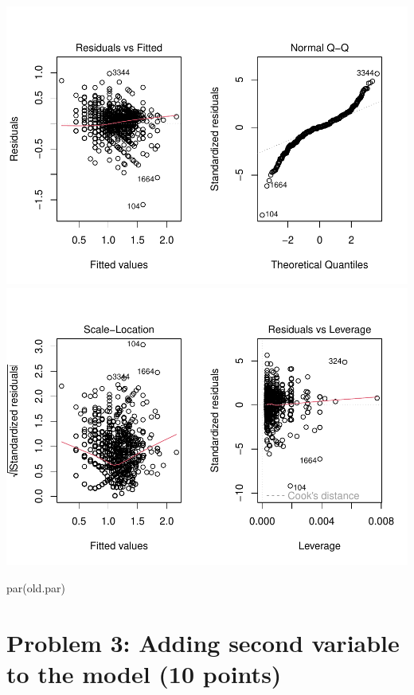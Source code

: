 \documentclass[
]{article}
\newenvironment{Shaded}{\begin{snugshade}}{\end{snugshade}}
\newcommand{\FunctionTok}[1]{\textcolor[rgb]{0.00,0.00,0.00}{#1}}
\newcommand{\NormalTok}[1]{#1}
\begin{document}
\includegraphics{linear_regression__uc_files/figure-latex/Problem2_Q3-1.pdf}
\includegraphics{linear_regression__uc_files/figure-latex/Problem2_Q3-2.pdf}

\begin{Shaded}
\begin{Highlighting}[]
\FunctionTok{par}\NormalTok{(old.par)}
\end{Highlighting}
\end{Shaded}

\hypertarget{problem-3-adding-second-variable-to-the-model-10-points}{%
\section{Problem 3: Adding second variable to the model (10
points)}\label{problem-3-adding-second-variable-to-the-model-10-points}}
\end{document}
